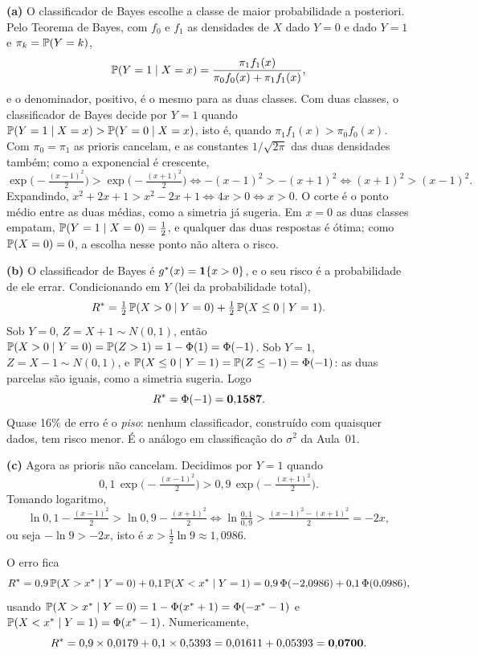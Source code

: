 \documentclass[11pt,a4paper]{article}
\begin{document}
\begin{solucao}
\textbf{(a)} O classificador de Bayes escolhe a classe de maior probabilidade a
posteriori. Pelo Teorema de Bayes, com $f_0$ e $f_1$ as densidades de $X$ dado
$Y=0$ e dado $Y=1$ e $\pi_k=\mathbb{P}(Y=k)$,
\[
  \mathbb{P}(Y=1\mid X=x) = \frac{\pi_1 f_1(x)}{\pi_0 f_0(x)+\pi_1 f_1(x)},
\]
e o denominador, positivo, é o mesmo para as duas classes. Com duas classes, o
classificador de Bayes decide por $Y=1$ quando $\mathbb{P}(Y=1\mid X=x)>\mathbb{P}(Y=0\mid
X=x)$, isto é, quando $\pi_1 f_1(x) > \pi_0 f_0(x)$. Com $\pi_0=\pi_1$ as prioris
cancelam, e as constantes $1/\sqrt{2\pi}$ das duas densidades também; como a
exponencial é crescente,
\[
  \exp\Big(-\tfrac{(x-1)^2}{2}\Big) > \exp\Big(-\tfrac{(x+1)^2}{2}\Big)
  \iff -(x-1)^2 > -(x+1)^2
  \iff (x+1)^2 > (x-1)^2 .
\]
Expandindo, $x^2+2x+1 > x^2-2x+1 \iff 4x>0 \iff x>0$. O corte é o ponto médio
entre as duas médias, como a simetria já sugeria. Em $x=0$ as duas classes
empatam, $\mathbb{P}(Y=1\mid X=0)=\tfrac12$, e qualquer das duas respostas é ótima; como
$\mathbb{P}(X=0)=0$, a escolha nesse ponto não altera o risco.

\smallskip
\textbf{(b)} O classificador de Bayes é $g^\ast(x)=\mathbf{1}\!\left\{x>0\right\}$, e o seu risco é a
probabilidade de ele errar. Condicionando em $Y$ (lei da probabilidade total),
\[
  R^\ast = \tfrac12\,\mathbb{P}(X>0\mid Y=0) + \tfrac12\,\mathbb{P}(X\le 0\mid Y=1).
\]
Sob $Y=0$, $Z=X+1\sim N(0,1)$, então $\mathbb{P}(X>0\mid Y=0)=\mathbb{P}(Z>1)=1-\Phi(1)
=\Phi(-1)$. Sob $Y=1$, $Z=X-1\sim N(0,1)$, e $\mathbb{P}(X\le 0\mid Y=1)=\mathbb{P}(Z\le -1)
=\Phi(-1)$: as duas parcelas são iguais, como a simetria sugeria. Logo
\[
  R^\ast = \Phi(-1) = \mathbf{0{,}1587}.
\]
Quase 16\% de erro é o \emph{piso}: nenhum classificador, construído com quaisquer
dados, tem risco menor. É o análogo em classificação do $\sigma^2$ da Aula~01.

\smallskip
\textbf{(c)} Agora as prioris não cancelam. Decidimos por $Y=1$ quando
\[
  0{,}1\,\exp\Big(-\tfrac{(x-1)^2}{2}\Big) > 0{,}9\,\exp\Big(-\tfrac{(x+1)^2}{2}\Big).
\]
Tomando logaritmo,
\[
  \ln 0{,}1 - \tfrac{(x-1)^2}{2} > \ln 0{,}9 - \tfrac{(x+1)^2}{2}
  \iff \ln\tfrac{0{,}1}{0{,}9} > \tfrac{(x-1)^2-(x+1)^2}{2} = -2x,
\]
ou seja $-\ln 9 > -2x$, isto é $x > \tfrac12\ln 9 \approx 1{,}0986$.

O erro fica
\[
  R^\ast = 0{,}9\,\mathbb{P}(X>x^\ast\mid Y=0) + 0{,}1\,\mathbb{P}(X<x^\ast\mid Y=1)
   = 0{,}9\,\Phi(-2{,}0986) + 0{,}1\,\Phi(0{,}0986),
\]
usando $\mathbb{P}(X>x^\ast\mid Y=0)=1-\Phi(x^\ast+1)=\Phi(-x^\ast-1)$ e
$\mathbb{P}(X<x^\ast\mid Y=1)=\Phi(x^\ast-1)$. Numericamente,
\[
  R^\ast = 0{,}9\times 0{,}0179 + 0{,}1\times 0{,}5393
   = 0{,}01611 + 0{,}05393 = \mathbf{0{,}0700}.
\]


\end{solucao}
\end{document}
